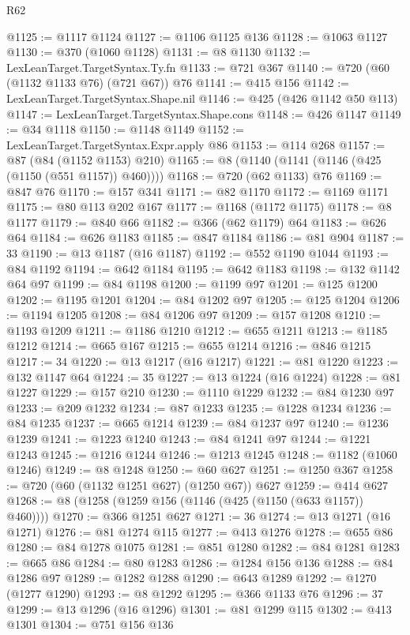 \begin{lexlean}{R62}
\begin{coremodule}
@1125 := @1117 @1124
@1127 := @1106 @1125 @136
@1128 := @1063 @1127
@1130 := @370 (@1060 @1128)
@1131 := @8 @1130
@1132 := LexLeanTarget.TargetSyntax.Ty.fn
@1133 := @721 @367
@1140 := @720 (@60 (@1132 @1133 @76) (@721 @67)) @76
@1141 := @415 @156
@1142 := LexLeanTarget.TargetSyntax.Shape.nil
@1146 := @425 (@426 @1142 @50 @113)
@1147 := LexLeanTarget.TargetSyntax.Shape.cons
@1148 := @426 @1147
@1149 := @34 @1118
@1150 := @1148 @1149
@1152 := LexLeanTarget.TargetSyntax.Expr.apply @86
@1153 := @114 @268
@1157 := @87 (@84 (@1152 @1153) @210)
@1165 := @8 (@1140 (@1141 (@1146 (@425 (@1150 (@551 @1157)) @460))))
@1168 := @720 (@62 @1133) @76
@1169 := @847 @76
@1170 := @157 @341
@1171 := @82 @1170
@1172 := @1169 @1171
@1175 := @80 @113 @202 @167
@1177 := @1168 (@1172 @1175)
@1178 := @8 @1177
@1179 := @840 @66
@1182 := @366 (@62 @1179) @64
@1183 := @626 @64
@1184 := @626 @1183
@1185 := @847 @1184
@1186 := @81 @904
@1187 := 33
@1190 := @13 @1187 (@16 @1187)
@1192 := @552 @1190 @1044
@1193 := @84 @1192
@1194 := @642 @1184
@1195 := @642 @1183
@1198 := @132 @1142 @64 @97
@1199 := @84 @1198
@1200 := @1199 @97
@1201 := @125 @1200
@1202 := @1195 @1201
@1204 := @84 @1202 @97
@1205 := @125 @1204
@1206 := @1194 @1205
@1208 := @84 @1206 @97
@1209 := @157 @1208
@1210 := @1193 @1209
@1211 := @1186 @1210
@1212 := @655 @1211
@1213 := @1185 @1212
@1214 := @665 @167
@1215 := @655 @1214
@1216 := @846 @1215
@1217 := 34
@1220 := @13 @1217 (@16 @1217)
@1221 := @81 @1220
@1223 := @132 @1147 @64
@1224 := 35
@1227 := @13 @1224 (@16 @1224)
@1228 := @81 @1227
@1229 := @157 @210
@1230 := @1110 @1229
@1232 := @84 @1230 @97
@1233 := @209 @1232
@1234 := @87 @1233
@1235 := @1228 @1234
@1236 := @84 @1235
@1237 := @665 @1214
@1239 := @84 @1237 @97
@1240 := @1236 @1239
@1241 := @1223 @1240
@1243 := @84 @1241 @97
@1244 := @1221 @1243
@1245 := @1216 @1244
@1246 := @1213 @1245
@1248 := @1182 (@1060 @1246)
@1249 := @8 @1248
@1250 := @60 @627
@1251 := @1250 @367
@1258 := @720 (@60 (@1132 @1251 @627) (@1250 @67)) @627
@1259 := @414 @627
@1268 := @8 (@1258 (@1259 @156 (@1146 (@425 (@1150 (@633 @1157)) @460))))
@1270 := @366 @1251 @627
@1271 := 36
@1274 := @13 @1271 (@16 @1271)
@1276 := @81 @1274 @115
@1277 := @413 @1276
@1278 := @655 @86
@1280 := @84 @1278 @1075
@1281 := @851 @1280
@1282 := @84 @1281
@1283 := @665 @86
@1284 := @80 @1283
@1286 := @1284 @156 @136
@1288 := @84 @1286 @97
@1289 := @1282 @1288
@1290 := @643 @1289
@1292 := @1270 (@1277 @1290)
@1293 := @8 @1292
@1295 := @366 @1133 @76
@1296 := 37
@1299 := @13 @1296 (@16 @1296)
@1301 := @81 @1299 @115
@1302 := @413 @1301
@1304 := @751 @156 @136

\end{coremodule}
\end{lexlean}

